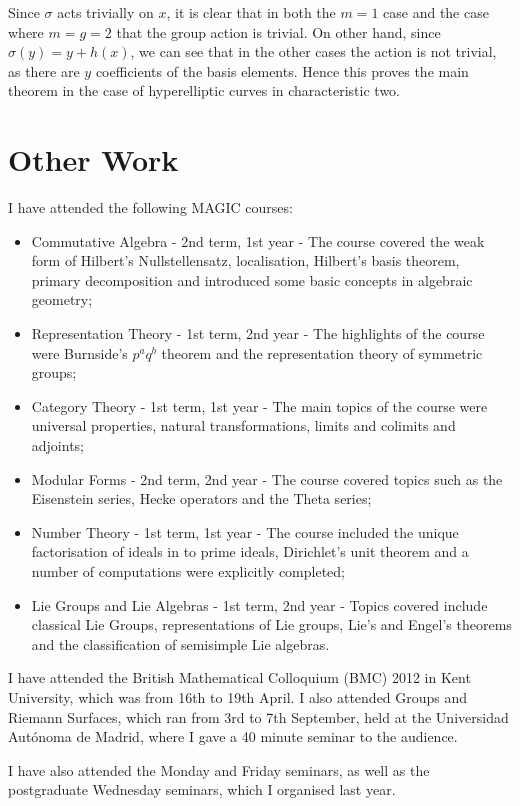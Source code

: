 \documentclass[draft, 11pt]{article} %
\theoremstyle{plain}
\theoremstyle{remark}
\begin{document}
  Since $\sigma$ acts trivially on $x$, it is clear that in both the $m=1$ case and the case where $m=g=2$ that the group action is trivial.
  On other hand, since $\sigma(y) = y+h(x)$, we can see that in the other cases the action is not trivial, as there are $y$ coefficients of the basis elements.
  Hence this proves the main theorem in the case of hyperelliptic curves in characteristic two.
  
  \newpage
  
\section{Other Work}
I have attended the following MAGIC courses:
\begin{itemize}
 \item Commutative Algebra - 2nd term, 1st year - The course covered the weak form of Hilbert's Nullstellensatz, localisation, Hilbert's basis theorem, primary decomposition and introduced some basic concepts in algebraic geometry;
 \item Representation Theory - 1st term, 2nd year - The highlights of the course were Burnside's $p^aq^b$ theorem and the representation theory of symmetric groups;
 \item Category Theory - 1st term, 1st year - The main topics of the course were universal properties, natural transformations, limits and colimits and adjoints;
 \item Modular Forms - 2nd term, 2nd year - The course covered topics such as the Eisenstein series, Hecke operators and the Theta series;
 \item Number Theory - 1st term, 1st year - The course included the unique factorisation of ideals in to prime ideals, Dirichlet's unit theorem and a number of computations were explicitly completed;
 \item Lie Groups and Lie Algebras - 1st term, 2nd year - Topics covered include classical Lie Groups, representations of Lie groups, Lie's and Engel's theorems and the classification of semisimple Lie algebras.
\end{itemize}

I have attended the British Mathematical Colloquium (BMC) 2012 in Kent University, which was from 16th  to 19th April.
I also attended Groups and Riemann Surfaces, which ran from 3rd to 7th September,  held at the Universidad Autónoma de Madrid, where I gave a 40 minute seminar to the audience.

I have also attended the Monday and Friday seminars, as well as the postgraduate Wednesday seminars, which I organised last year.

\newpage



\end{document}
